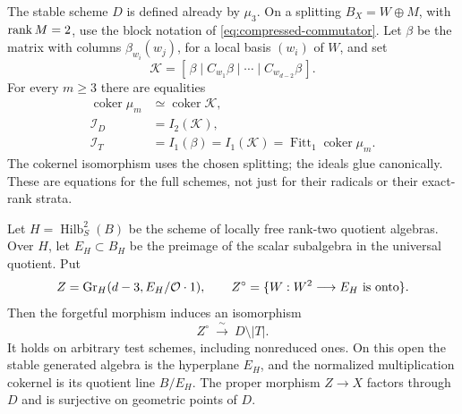 \begin{theorem}
\label{thm:full-codimension-two}
The stable scheme $D$ is defined already by $\mu_3$. On a splitting
$B_X=W\oplus M$, with $\operatorname{rank} M=2$, use the block notation of
\eqref{eq:compressed-commutator}. Let $\beta$ be the matrix with
columns $\beta_{w_i}(w_j)$, for a local basis $(w_i)$ of $W$, and set
\begin{equation}\label{eq:codim-two-matrix}
 \mathcal K=[\,\beta\mid C_{w_1}\beta\mid\cdots\mid C_{w_{d-2}}\beta\,].
\end{equation}
For every $m\ge3$ there are equalities
\begin{equation}\label{eq:full-codim-two-ideals}
 \begin{split}
 \operatorname{coker}\mu_m&\simeq\operatorname{coker}\mathcal K,\\
 \mathcal I_D&=I_2(\mathcal K),\\
 \mathcal I_T&=I_1(\beta)=I_1(\mathcal K)
       =\operatorname{Fitt}_1\operatorname{coker}\mu_m.
 \end{split}
\end{equation}
The cokernel isomorphism uses the chosen splitting; the ideals glue
canonically. These are equations for the full schemes, not just
for their radicals or their exact-rank strata.

Let $H=\operatorname{Hilb}^2_S(B)$ be the scheme of locally free
rank-two quotient algebras. Over $H$, let $E_H\subset B_H$ be the
preimage of the scalar subalgebra in the universal quotient. Put
\[
 Z=\operatorname{Gr}_H(d-3,E_H/\mathcal O\cdot1),\qquad
 Z^\circ=\{W:W^2\longrightarrow E_H\text{ is onto}\}.
\]
Then the forgetful morphism induces an isomorphism
\begin{equation}\label{eq:codim-two-incidence}
 Z^\circ\ \xrightarrow{\ \sim\ }\ D\setminus|T|.
\end{equation}
It holds on arbitrary test schemes, including nonreduced ones.
On this open the stable generated algebra is the hyperplane $E_H$,
and the normalized multiplication cokernel is its quotient line
$B/E_H$. The proper morphism $Z\to X$ factors through $D$ and is
surjective on geometric points of $D$.
\end{theorem}
